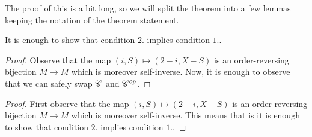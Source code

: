 \documentclass[../../thesis.tex]{subfiles}
\begin{document}
The proof of this is a bit long, so we will split the theorem into a few lemmas keeping the notation of the theorem statement.
\begin{lemma}
    It is enough to show that condition $2.$ implies condition $1.$.
\end{lemma}
\begin{proof}
    Observe that the map $(i,S) \mapsto (2-i, X-S)$ is an order-reversing bijection $M\to M$ which is moreover self-inverse.
    Now, it is enough to observe that we can safely swap $\mathscr{C}$ and $\mathscr{C}^{op}$.
\end{proof}
\begin{proof}
    First observe that the map $(i,S) \mapsto (2-i, X-S)$ is an order-reversing bijection $M\to M$ which is moreover self-inverse.
    This means that is it is enough to show that condition $2.$ implies condition $1.$.



\end{proof}
\end{document}
